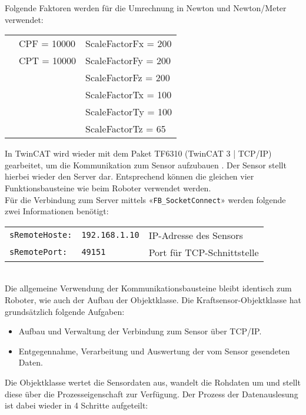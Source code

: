 		Folgende Faktoren werden für die Umrechnung in Newton und Newton/Meter verwendet: 
		
		\begin{tabularx}{\textwidth}{@{}>{}p{8em} @{}>{}p{8em} @{}>{}p{10em}}
			& CPF = 10000 		& ScaleFactorFx = 200
			\\
			& CPT = 10000 		& ScaleFactorFy = 200
			\\
			& 					& ScaleFactorFz = 200
			\\
			& 					& ScaleFactorTx = 100
			\\
			& 					& ScaleFactorTy = 100
			\\
			& 					& ScaleFactorTz = 65
			\\
		\end{tabularx}
		
		In TwinCAT wird wieder mit dem Paket TF6310 (TwinCAT 3 | TCP/IP) gearbeitet, um die Kommunikation zum Sensor aufzubauen \cite{TF6310}. Der Sensor stellt hierbei wieder den Server dar. Entsprechend können die gleichen vier Funktionsbausteine wie beim Roboter verwendet werden.
		\\
		Für die Verbindung zum Server mittels «\verb|FB_SocketConnect|» werden folgende zwei Informationen benötigt: 
		
		\begin{tabularx}{\textwidth}{@{}>{}p{10em} @{}>{}p{8em} X@{}}
			\verb|sRemoteHoste:| 	& \verb|192.168.1.10|	& IP-Adresse des Sensors 
			\\
			\verb|sRemotePort:| 	& \verb|49151| 			& Port für TCP-Schnittstelle 
			\\
		\end{tabularx}
		\\
		
		Die allgemeine Verwendung der Kommunikationsbausteine bleibt identisch zum Roboter, wie auch der Aufbau der Objektklasse. Die Kraftsensor-Objektklasse hat grundsätzlich folgende Aufgaben: 
		\begin{itemize}
			\item Aufbau und Verwaltung der Verbindung zum Sensor über TCP/IP.
			\item Entgegennahme, Verarbeitung und Auswertung der vom Sensor gesendeten Daten.
		\end{itemize}
		\vspace{3mm}
		
		Die Objektklasse wertet die Sensordaten aus, wandelt die Rohdaten um und stellt diese über die Prozesseigenschaft zur Verfügung. Der Prozess der Datenauslesung ist dabei wieder in 4 Schritte aufgeteilt: 
		
